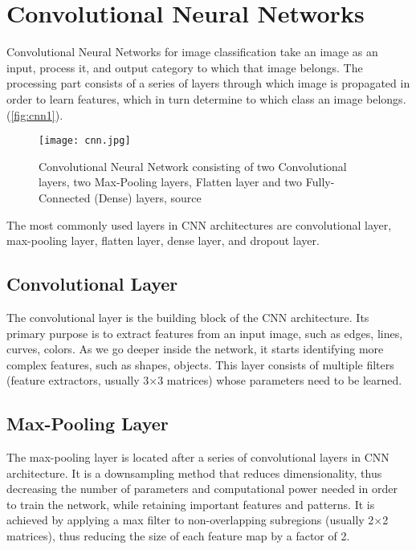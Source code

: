 \chapter{Convolutional Neural Networks}
\label{appx:simulation}

Convolutional Neural Networks for image classification \cite{krizhevsky2012imagenet} take an image as an input, process it, and output category to which that image belongs. The processing part consists of a series of layers through which image is propagated in order to learn features, which in turn determine to which class an image belongs. (\textcolor{red}{\autoref{fig:cnn1}}).

\begin{figure}[h]
	\centering
	\texttt{[image: cnn.jpg]}
	\caption{Convolutional Neural Network consisting of two Convolutional layers, two Max-Pooling layers, Flatten layer and two Fully-Connected (Dense) layers, source \cite{alom2019state}}
	\label{fig:cnn1}
\end{figure}

The most commonly used layers in CNN architectures are convolutional layer, max-pooling layer, flatten layer, dense layer, and dropout layer.

\section{Convolutional Layer}

The convolutional layer is the building block of the CNN architecture. Its primary purpose is to extract features from an input image, such as edges, lines, curves, colors. As we go deeper inside the network, it starts identifying more complex features, such as shapes, objects. This layer consists of multiple filters (feature extractors, usually 3$\times$3 matrices) whose parameters need to be learned.
\section{Max-Pooling Layer}

The max-pooling layer is located after a series of convolutional layers in CNN architecture. It is a downsampling method that reduces dimensionality, thus decreasing the number of parameters and computational power needed in order to train the network, while retaining important features and patterns. It is achieved by applying a max filter to non-overlapping subregions (usually 2$\times$2 matrices), thus reducing the size of each feature map by a factor of 2.

